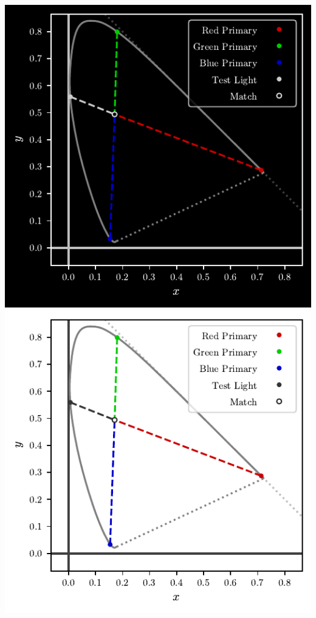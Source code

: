\documentclass{article}
\newenvironment{halffigure}
    {\par\medskip\noindent\minipage{\linewidth}}
    {\endminipage\par\medskip}
\newif\ifinvert
\begin{document}
\begin{multicols}{2}
\begin{halffigure} %
    \ifinvert
        \includegraphics{../images/figure_10_color_matching_experiment_mixing_inverted.pdf}
    \else
        \includegraphics{../images/figure_10_color_matching_experiment_mixing.pdf}

\end{halffigure}
\end{multicols}
\end{document}
